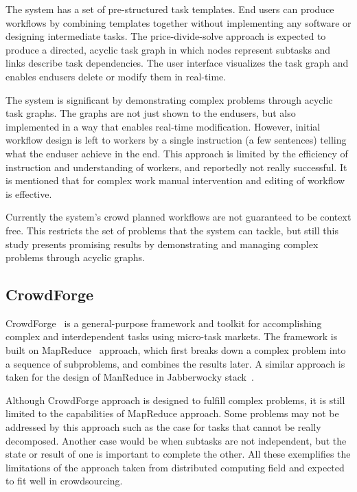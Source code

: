 The system has a set of pre-structured task templates. End users can produce 
workflows by combining templates together without implementing any software 
or designing intermediate tasks. The price-divide-solve approach is expected 
to produce a directed, acyclic task graph in which nodes represent subtasks and 
links describe task dependencies. The user interface visualizes the task graph 
and enables endusers delete or modify them in real-time.

The system is significant by demonstrating complex problems through acyclic 
task graphs. The graphs are not just shown to the endusers, but also implemented 
in a way that enables real-time modification. However, initial workflow design 
is left to workers by a single instruction (a few sentences) telling what the enduser 
achieve in the end. This approach is limited by the efficiency of instruction and 
understanding of workers, and reportedly not really successful. It is mentioned 
that for complex work manual intervention and editing of workflow is effective.

Currently the system's crowd planned workflows are not guaranteed to be 
context free. This restricts the set of problems that the system can tackle, 
but still this study presents promising results by demonstrating and managing 
complex problems through acyclic graphs.


\subsection{CrowdForge}
CrowdForge~\cite{Kittur2011} is a general-purpose framework and toolkit for 
accomplishing complex and interdependent tasks using micro-task markets. 
The framework is built on MapReduce~\cite{Dean2008} approach, which first breaks 
down a complex problem into a sequence of subproblems, and combines the results 
later. A similar approach is taken for the design of ManReduce in Jabberwocky 
stack~\cite{Ahmad2011}.

Although CrowdForge approach is designed to fulfill complex problems, it is still limited 
to the capabilities of MapReduce approach. Some problems may not be addressed 
by this approach such as the case for tasks that cannot be really decomposed. 
Another case would be when subtasks are not independent, but the state 
or result of one is important to complete the other. All these exemplifies the 
limitations of the approach taken from distributed computing field and 
expected to fit well in crowdsourcing.

